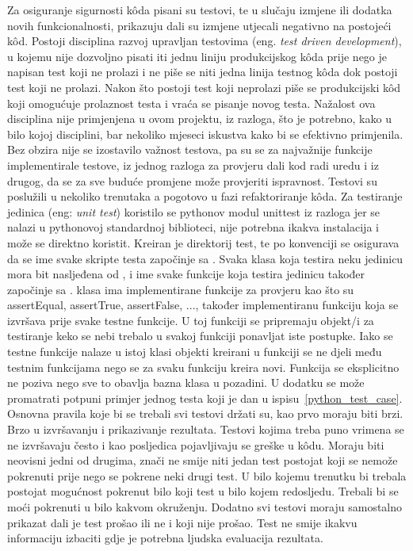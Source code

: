 Za osiguranje sigurnosti k\^oda pisani su testovi, te u slučaju izmjene ili dodatka novih funkcionalnosti, prikazuju dali su izmjene utjecali negativno na postojeći k\^od. Postoji disciplina razvoj upravljan testovima (eng. \textit{test driven development}), u kojemu nije dozvoljno pisati iti jednu liniju produkcijskog k\^oda prije nego je napisan test koji ne prolazi i ne piše se niti jedna linija testnog k\^oda dok postoji test koji ne prolazi. Nakon što postoji test koji neprolazi piše se produkcijski k\^od koji omogućuje prolaznost testa i vraća se pisanje novog testa. Nažalost ova disciplina nije primjenjena u ovom projektu, iz razloga, što je potrebno, kako u bilo kojoj disciplini, bar nekoliko mjeseci iskustva kako bi se efektivno primjenila. Bez obzira nije se izostavilo važnost testova, pa su se za najvažnije funkcije implementirale testove, iz jednog razloga za provjeru dali kod radi uredu i iz drugog, da se za sve buduće promjene može provjeriti ispravnost. Testovi su poslužili u nekoliko trenutaka a pogotovo u fazi refaktoriranje k\^oda. Za testiranje jedinica (eng: \textit{unit test}) koristilo se pythonov modul unittest iz razloga jer se nalazi u pythonovoj standardnoj biblioteci, nije potrebna ikakva instalacija i može se direktno koristit. Kreiran je direktorij test, te po konvenciji se osigurava da se ime svake skripte testa započinje sa . Svaka klasa koja testira neku jedinicu mora bit nasljeđena od , i ime svake funkcije koja testira jedinicu također započinje sa .  klasa ima implementirane funkcije za provjeru kao što su assertEqual, assertTrue, assertFalse, ..., također implementiranu funkciju  koja se izvršava prije svake testne funkcije. U toj funkciji se pripremaju objekt/i za testiranje keko se nebi trebalo u svakoj funkciji ponavljat iste postupke. Iako se testne funkcije nalaze u istoj klasi objekti kreirani u  funkciji se ne djeli među testnim funkcijama nego se za svaku funkciju kreira novi. Funkcija  se eksplicitno ne poziva nego sve to obavlja bazna klasa  u pozadini. U dodatku se može promatrati potpuni primjer jednog testa koji je dan u ispisu~\ref{python_test_case}. Osnovna pravila koje bi se trebali svi testovi držati su, kao prvo moraju biti brzi. Brzo u izvršavanju i prikazivanje rezultata. Testovi kojima treba puno vrimena se ne izvršavaju često i kao posljedica pojavljivaju se greške u k\^odu. Moraju biti neovisni jedni od drugima, znači ne smije niti jedan test postojat koji se nemože pokrenuti prije nego se pokrene neki drugi test. U bilo kojemu trenutku bi trebala postojat mogućnost pokrenut bilo koji test u bilo kojem redosljedu. Trebali bi se moći pokrenuti u bilo kakvom okruženju. Dodatno svi testovi moraju samostalno prikazat dali je test prošao ili ne i koji nije prošao. Test ne smije ikakvu informaciju izbaciti gdje je potrebna ljudska evaluacija rezultata.

